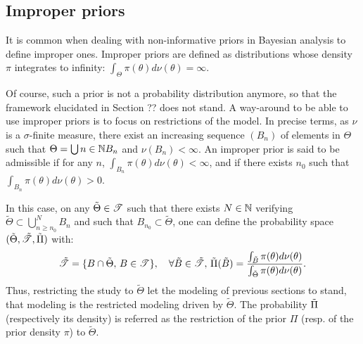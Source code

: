 \subsection{Improper priors}

It is common when dealing with non-informative priors in Bayesian analysis to define improper ones.
Improper priors are defined as distributions whose density $\pi$ integrates to infinity: $\int_\Theta\pi(\theta)d\nu(\theta)=\infty$. 

Of course, such a prior is not a probability distribution anymore, so that the framework elucidated in Section ?? does not stand. 
A way-around to be able to use improper priors is to focus on restrictions of the model. In precise terms,  as $\nu$ is a $\sigma$-finite measure, there exist an increasing sequence $(B_n)$ of elements in $\Theta$ such that 
$\Theta=\bigcup{n\in\mathbb{N}}B_n$ and $\nu(B_n) <\infty$.
An improper prior is said to be admissible if for any $n$, $\int_{B_n}\pi(\theta)d\nu(\theta)<\infty$, and if there exists $n_0$ such that $\int_{B_n}\pi(\theta)d\nu(\theta)>0$.

In this case, on any $\tilde\Theta\in\mathscr{T}$ such that there exists $N\in\mathbb{N}$ verifying $\tilde\Theta\subset\bigcup_{n\geq n_0}^NB_n$ and such that $B_{n_0}\subset\tilde\Theta$, one can define the probability space $(\tilde\Theta,\tilde{\mathscr{T}},\tilde\Pi)$ with:
    \begin{equation}
        \tilde{\mathscr{T}} = \{B\cap\tilde\Theta,\,B\in\mathscr{T}\},\quad\forall \tilde B\in\tilde{\mathscr{T}},\,\tilde\Pi(\tilde B) = \frac{\int_{\tilde B}\pi(\theta)d\nu(\theta)}{\int_{\tilde\Theta}\pi(\theta)d\nu(\theta)}.
    \end{equation}
Thus, restricting the study to $\tilde\Theta$ let the modeling of previous sections to stand, that modeling is the restricted modeling driven by $\tilde\Theta$. 
The probability $\Tilde\Pi$ (respectively its density) is referred as the restriction of the prior $\Pi$ (resp. of the prior density $\pi$) to $\tilde\Theta$.

